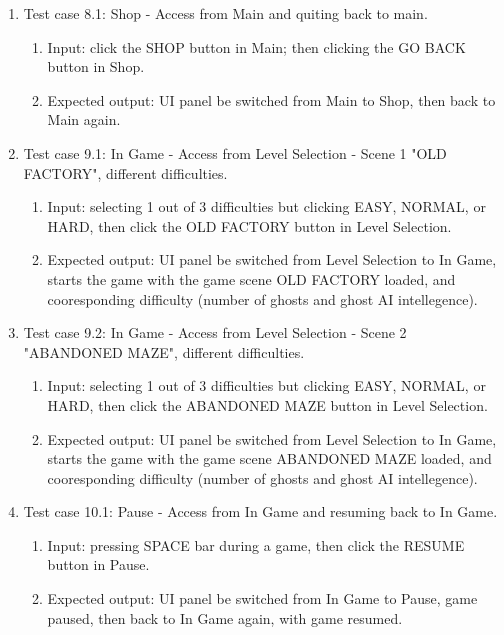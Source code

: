 \documentclass[11pt]{article}
\begin{document}
\begin{enumerate}
\begin{enumerate}
        \end{enumerate}
        \item Test case 8.1: Shop - Access from Main and quiting back to main.
        \begin{enumerate}
            \item  Input: click the SHOP button in Main; then clicking the GO BACK button in Shop.
            \item  Expected output: UI panel be switched from Main to Shop, then back to Main again.
        \end{enumerate}
        \item Test case 9.1: In Game - Access from Level Selection - Scene 1 "OLD FACTORY", different difficulties.
        \begin{enumerate}
            \item  Input: selecting 1 out of 3 difficulties but clicking EASY, NORMAL, or HARD, then click the OLD FACTORY button in Level Selection.
            \item  Expected output: UI panel be switched from Level Selection to In Game, starts the game with the game scene OLD FACTORY loaded, and cooresponding difficulty (number of ghosts and ghost AI intellegence).
        \end{enumerate}
        \item Test case 9.2: In Game - Access from Level Selection - Scene 2 "ABANDONED MAZE", different difficulties.
        \begin{enumerate}
            \item  Input: selecting 1 out of 3 difficulties but clicking EASY, NORMAL, or HARD, then click the ABANDONED MAZE button in Level Selection.
            \item  Expected output: UI panel be switched from Level Selection to In Game, starts the game with the game scene ABANDONED MAZE loaded, and cooresponding difficulty (number of ghosts and ghost AI intellegence).
        \end{enumerate}
        \item Test case 10.1: Pause - Access from In Game and resuming back to In Game.
        \begin{enumerate}
            \item  Input: pressing SPACE bar during a game, then click the RESUME button in Pause.
            \item  Expected output: UI panel be switched from In Game to Pause, game paused, then back to In Game again, with game resumed.
        \end{enumerate}

\end{enumerate}
\end{document}
